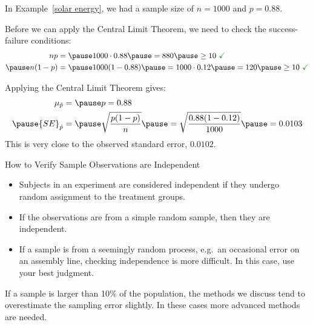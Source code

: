 \documentclass{beamer}
\newcommand{\satisfied}[0]{{\color{green!70!black}\checkmark}}
\begin{document}
\begin{frame}
  \begin{example}\label{solar CLT}
    \vspace{-2mm}%
    In Example~\ref{solar energy}, we had a sample size of $n=1000$ and $p=0.88$.\pause

    \vspace{1mm}
    Before we can apply the Central Limit Theorem, we need to check the success-failure conditions:
    \begin{equation*}
      \begin{aligned}
        np &= \pause
        1000\cdot 0.88\pause
        = 880\pause
        \geq 10~\satisfied \\\pause
        n(1-p) &= \pause
        1000(1-0.88)\pause
        = 1000\cdot 0.12\pause
        = 120\pause
        \geq 10~\satisfied
      \end{aligned}
    \end{equation*}\pause

    Applying the Central Limit Theorem gives:
    \begin{equation*}
      \begin{aligned}
        \mu_{\hat{p}} &=\pause
        p = 0.88 \\\pause
        {SE}_{\hat{p}} &= \pause
        \sqrt{\dfrac{p(1-p)}{n}}\pause
        = \sqrt{\dfrac{0.88(1-0.12)}{1000}}\pause
        = 0.0103
      \end{aligned}
    \end{equation*}\pause
    This is very close to the observed standard error, $0.0102$.
  \end{example}
\end{frame}

\begin{frame}
  \begin{block}{How to Verify Sample Observations are Independent}
    \begin{itemize}
    \item Subjects in an experiment are considered independent if they undergo random assignment to the treatment groups.\pause
    \item If the observations are from a simple random sample, then they are independent.\pause
    \item If a sample is from a seemingly random process, e.g.\  an occasional error on an assembly line, checking independence is more difficult. In this case, use your best judgment.
    \end{itemize}
  \end{block}\pause

  \begin{note}
    If a sample is larger than 10\% of the population, the methods we discuss tend to overestimate the sampling error slightly. In these cases more advanced methods are needed.
  \end{note}
\end{frame}
\end{document}
